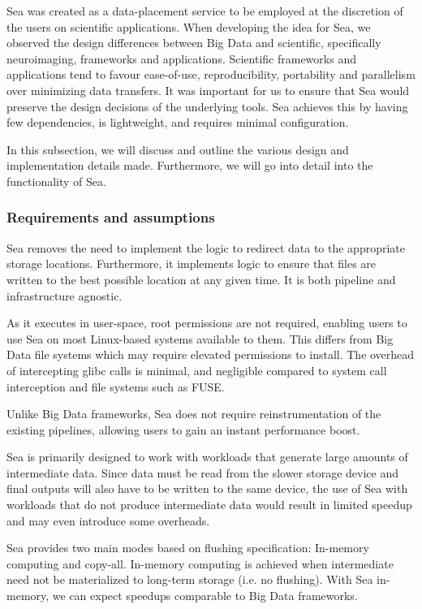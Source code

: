 \documentclass[10pt,journal,compsoc]{IEEEtran}
\begin{document}
Sea was created as a data-placement service to be employed at the discretion of
the users on scientific applications. When developing the idea for Sea, we
observed the design differences between Big Data and scientific, specifically
neuroimaging, frameworks and applications. Scientific frameworks and
applications tend to favour ease-of-use, reproducibility, portability and
parallelism over minimizing data
transfers\cite{jarecka2020pydra,esteban2019fmriprep,wagner2022fairly}. It was
important for us to ensure that Sea would preserve the design decisions of the
underlying tools. Sea achieves this by having few dependencies, is lightweight,
and requires minimal configuration.

In this subsection, we will discuss and outline the various design and
implementation details made. Furthermore, we will go into detail into the
functionality of Sea.

\subsubsection{Requirements and assumptions}

Sea removes the need to implement the logic to redirect data to the appropriate
storage locations. Furthermore, it implements logic to ensure that files are
written to the best possible location at any given time. It is both pipeline and
infrastructure agnostic.

As it executes in user-space, root permissions are not required, enabling users
to use Sea on most Linux-based systems available to them. This differs from Big
Data file systems which may require elevated permissions to install. The
overhead of intercepting glibc calls is minimal, and negligible compared to
system call interception and file systems such as FUSE.

Unlike Big Data frameworks, Sea does not require reinstrumentation of the
existing pipelines, allowing users to gain an instant performance boost.

Sea is primarily designed to work with workloads that generate large amounts of
intermediate data. Since data must be read from the slower storage device and final outputs will
also have to be written to the same device, the
use of Sea with workloads that do not produce intermediate data would result in
limited speedup and may even introduce some overheads. 

Sea provides two main modes based on flushing specification: In-memory computing
and copy-all. In-memory computing is achieved when intermediate need not be
materialized to long-term storage (i.e. no flushing). With Sea in-memory, we can
expect speedups comparable to Big Data frameworks.
\end{document}
